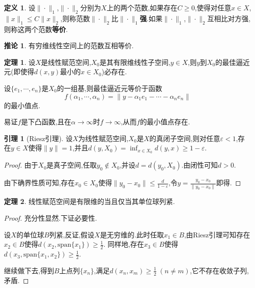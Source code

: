 \documentclass{ctexart}
\theoremstyle{definition}
\newtheorem{definition}{定义}
\newtheorem{lemma}{引理}
\newtheorem{theorem}{定理}
\newtheorem{corollary}{推论}
\theoremstyle{remark}
\newenvironment{proofsketch}{
  \renewcommand{\proofname}{证明概要}\proof}{\endproof}
\begin{document}
	\begin{definition}
		设$\|\cdot\|_1$,$\|\cdot\|_2$分别为$X$上的两个范数,如果存在$C\ge 0$,使得对任意$x\in X$,$\|x\|_1\le C\|x\|_2$,则称范数$\|\cdot\|_2$比$\|\cdot\|_1$\textbf{强}.如果$\|\cdot\|_1$,$\|\cdot\|_2$互相比对方强,则称这两个范数\textbf{等价}.
	\end{definition}
	\begin{corollary}
		有穷维线性空间上的范数互相等价.
	\end{corollary}
	\begin{theorem}
		设$X$是线性赋范空间,$X_0$是其有限维线性子空间,$y\in X$,则$y$到$X_0$的最佳逼近元(即使得$d(x,y)$最小的$x\in X_0$)必存在.
	\end{theorem}
	\begin{proofsketch}
		设$\{e_1,\cdots,e_n\}$是$X_0$的一组基,则最佳逼近元等价于函数
		$$f(\alpha_1,\cdots,\alpha_n)=\|y-\alpha_1e_1-\cdots-\alpha_ne_n\|$$
		的最小值点.
		
		易证$f$是下凸函数,且在$\alpha\to\infty$时$f\to\infty$,从而$f$的最小值点存在.
	\end{proofsketch}
	\begin{lemma}[Riesz引理]
		设$X$为线性赋范空间,$X_0$是$X$的真闭子空间,则对任意$\varepsilon<1$,存在$y\in X$使得$\|y\|=1$,并且$d(y,X_0)=\inf_{x\in X_0}{d(y,x)}\ge 1-\varepsilon$.
	\end{lemma}
	\begin{proof}
		由于$X_0$是真子空间,任取$y_0\notin X_0$,并设$d=d(y_0,X_0)$.由闭性可知$d>0$.
		
		由下确界性质可知,存在$x_0\in X_0$使得$\|y_0-x_0\|\le\frac{d}{1-\varepsilon}$,令$y=\frac{y_0-x_0}{\|y_0-x_0\|}$即得.
	\end{proof}
	\begin{theorem}
		线性赋范空间是有限维的当且仅当其单位球列紧.
	\end{theorem}
	\begin{proof}
		充分性显然.下证必要性.
		
		设$X$的单位球$B$列紧,反证,假设$X$是无穷维的.此时任取$x_1\in B$,由Riesz引理可知存在$x_2\in B$使得$d(x_2,\mathrm{span}\{x_1\})\ge\frac{1}{2}$.
		同样地,存在$x_3\in B$使得$d(x_3,\mathrm{span}\{x_1,x_2\})\ge\frac{1}{2}$.
		
		继续做下去,得到$B$上点列$\{x_n\}$,满足$d(x_n,x_m)\ge\frac{1}{2}\;(n\ne m)$,它不存在收敛子列,矛盾.
	\end{proof}
	
\end{document}
